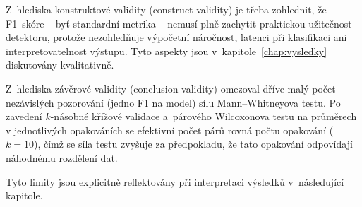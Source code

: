 Z~hlediska konstruktové validity (construct validity) je třeba zohlednit, že F1~skóre -- byť standardní metrika -- nemusí plně zachytit praktickou užitečnost detektoru, protože nezohledňuje výpočetní náročnost, latenci při klasifikaci ani interpretovatelnost výstupu. Tyto aspekty jsou v~kapitole~\ref{chap:vysledky} diskutovány kvalitativně.

Z~hlediska závěrové validity (conclusion validity) omezoval dříve malý počet nezávislých pozorování (jedno F1 na model) sílu Mann--Whitneyova testu. Po zavedení $k$-násobné křížové validace a~párového Wilcoxonova testu na průměrech v jednotlivých opakováních se efektivní počet párů rovná počtu opakování ($k=10$), čímž se síla testu zvyšuje za předpokladu, že tato opakování odpovídají náhodnému rozdělení dat.

Tyto limity jsou explicitně reflektovány při interpretaci výsledků v~následující kapitole.
